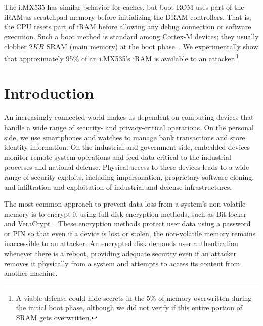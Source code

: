 The i.MX535 has similar behavior for caches, but boot ROM uses part of the iRAM as scratchpad memory before initializing the DRAM controllers.  
That is, the CPU resets part of iRAM before allowing any debug connection or software execution. 
Such a boot method is standard among Cortex-M devices;
they usually clobber $2KB$ SRAM (main memory) at the boot phase~\cite{saml11,MSP43_arm}.
We experimentally show that approximately 95\% of an i.MX535's iRAM is available to an attacker.\footnote{A viable defense could hide secrets in the 5\% of memory overwritten during the initial boot phase, although we did not verify if this entire portion of SRAM gets overwritten.} \section{Introduction}
\label{sec_introduction}


An increasingly connected world makes us dependent on computing devices that handle a wide range of security- and privacy-critical operations. 
On the personal side, we use smartphones and watches to manage bank transactions and store identity information. 
On the industrial and government side, embedded devices monitor remote system operations and feed data critical to the industrial processes and national defense. 
Physical access to these devices leads to a wide range of security exploits, including impersonation, proprietary software cloning, and infiltration and exploitation of industrial and defense infrastructures.   

The most common approach to prevent data loss from a system's non-volatile memory is to encrypt it using full disk encryption methods, such as Bit-locker~\cite{bitlocker} and VeraCrypt~\cite{knight2017encrypt}. 
These encryption methods protect user data using a password or PIN so that even if a device is lost or stolen, the non-volatile memory remains inaccessible to an attacker. 
An encrypted disk demands user authentication whenever there is a reboot, providing adequate security even if an attacker removes it physically from a system and attempts to access its content from another machine.


